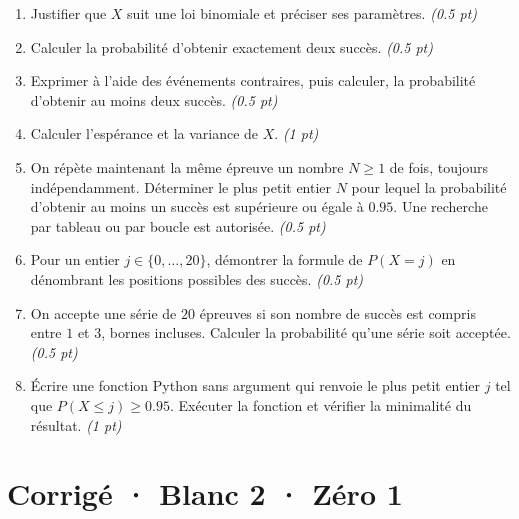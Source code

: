 \begin{enumerate}

\item Justifier que $X$ suit une loi binomiale et préciser ses paramètres. \hfill\textit{(\num{0,5} pt)}

\item Calculer la probabilité d'obtenir exactement deux succès. \hfill\textit{(\num{0,5} pt)}

\item Exprimer à l'aide des événements contraires, puis calculer, la probabilité d'obtenir au moins deux succès. \hfill\textit{(\num{0,5} pt)}

\item Calculer l'espérance et la variance de $X$. \hfill\textit{(1 pt)}

\item On répète maintenant la même épreuve un nombre $N\ge1$ de fois, toujours indépendamment. Déterminer le plus petit entier $N$ pour lequel la probabilité d'obtenir au moins un succès est supérieure ou égale à $\num{0,95}$. Une recherche par tableau ou par boucle est autorisée. \hfill\textit{(\num{0,5} pt)}

\item Pour un entier $j\in\{0,\ldots,20\}$, démontrer la formule de $P(X=j)$ en dénombrant les positions possibles des succès. \hfill\textit{(\num{0,5} pt)}

\item On accepte une série de $20$ épreuves si son nombre de succès est compris entre $1$ et $3$, bornes incluses. Calculer la probabilité qu'une série soit acceptée. \hfill\textit{(\num{0,5} pt)}

\item Écrire une fonction Python sans argument qui renvoie le plus petit entier $j$ tel que $P(X\le j)\ge\num{0,95}$. Exécuter la fonction et vérifier la minimalité du résultat. \hfill\textit{(1 pt)}

\end{enumerate}

\ifmxteacher\mxnewpage

\section*{Corrigé · Blanc 2 · Zéro 1}\label{cor:8-1}


